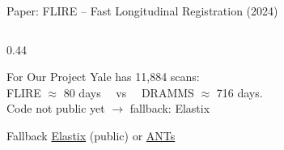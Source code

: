 \documentclass[aspectratio=169,xcolor=dvipsnames]{beamer}
\begin{document}
\begin{frame}{Paper: FLIRE -- Fast Longitudinal Registration (2024)}
\begin{columns}
\begin{column}{0.44\textwidth}
            \vspace{0.2em}

            \begin{alertblock}{For Our Project}
                \small
                Yale has 11,884 scans:\\
                FLIRE $\approx$ 80 days ~~vs~~ DRAMMS $\approx$ 716 days.\\
                {\scriptsize Code not public yet $\to$ fallback: Elastix}
            \end{alertblock}

            \begin{exampleblock}{\scriptsize {} Fallback}
                \scriptsize \href{https://elastix.lumc.nl/}{Elastix} (public) or \href{https://github.com/ANTsX/ANTs}{ANTs}
            \end{exampleblock}
        \end{column}
    \end{columns}
\end{frame}
\end{document}
